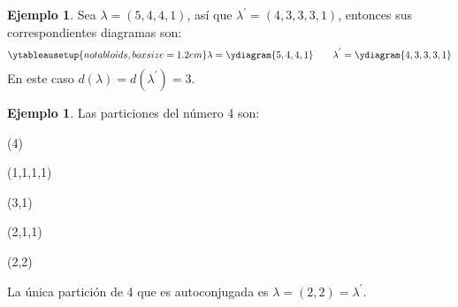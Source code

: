 \documentclass[12pt]{book}
\theoremstyle{definition}
\newtheorem{example}[theorem]{Ejemplo}
\newcounter{in}
\newcounter{ini}
\begin{document}
\begin{example}
Sea $\lambda=(5,4,4,1)$, así que $\lambda^{'}=(4,3,3,3,1)$, entonces sus correspondientes diagramas son:
  \begin{equation*}
    \ytableausetup{notabloids,boxsize=1.2em} 
    \lambda=\ydiagram{5,4,4,1} \qquad
    \lambda^{'}=\ydiagram{4,3,3,3,1}
  \end{equation*}
  En este caso $d(\lambda)=d(\lambda^{'})=3$.
\end{example}

\begin{example}Las particiones del número 4 son:
  \begin{center}
    \begin{minipage}[h]{0.2\linewidth}
      \centering {}

      (4)
    \end{minipage}
    \begin{minipage}[h]{0.15\linewidth}
      \centering {}

      (1,1,1,1)
    \end{minipage}
    \begin{minipage}[h]{0.2\linewidth}
      \centering {}
      
      (3,1)
    \end{minipage}
    \begin{minipage}[h]{0.2\linewidth}
      \centering {}
      
      (2,1,1)
    \end{minipage}
    \begin{minipage}[h]{0.2\linewidth}
      \centering {}
      
      (2,2)
    \end{minipage}
  \end{center}
 La única partición de 4 que es autoconjugada es $\lambda=(2,2)=\lambda^{'}$.
\end{example}
\end{document}
